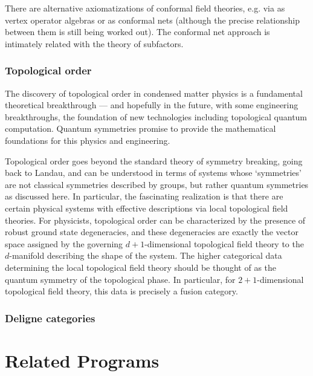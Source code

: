 \documentclass[11pt]{article}
\begin{document}
There are alternative axiomatizations of conformal field theories, e.g. via as vertex operator algebras or as conformal nets (although the precise relationship between them is still being worked out). The conformal net approach is intimately related with the theory of subfactors. 


\subsubsection{Topological order}

The discovery of topological order in condensed matter physics is a fundamental theoretical breakthrough --- and hopefully in the future, with some engineering breakthroughs, the foundation of new technologies including topological quantum computation. Quantum symmetries promise to provide the mathematical foundations for this physics and engineering.

Topological order goes beyond the standard theory of symmetry breaking, going back to Landau, and can be understood in terms of systems whose `symmetries' are not classical symmetries described by groups, but rather quantum symmetries as discussed here. In particular, the fascinating realization is that there are certain physical systems with effective descriptions via local topological field theories. For physicists, topological order can be characterized by the presence of robust ground state degeneracies, and these degeneracies are exactly the vector space assigned by the governing $d+1$-dimensional topological field theory to the $d$-manifold describing the shape of the system. The higher categorical data determining the local topological field theory should be thought of as the quantum symmetry of the topological phase. In particular, for $2+1$-dimensional topological field theory, this data is precisely a fusion category.


\subsubsection{Deligne categories}

\section{Related Programs}
\end{document}
